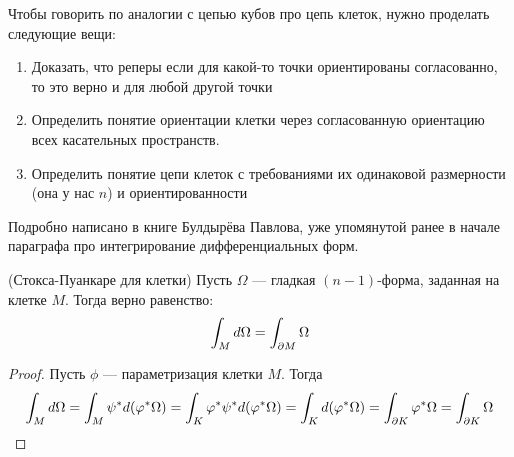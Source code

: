 \begin{anote}
	Чтобы говорить по аналогии с цепью кубов про цепь клеток, нужно проделать следующие вещи:
	\begin{enumerate}
		\item Доказать, что реперы если для какой-то точки ориентированы согласованно, то это верно и для любой другой точки
		
		\item Определить понятие ориентации клетки через согласованную ориентацию всех касательных пространств.
		
		\item Определить понятие цепи клеток с требованиями их одинаковой размерности (она у нас $n$) и ориентированности
	\end{enumerate}
	Подробно написано в книге Булдырёва Павлова, уже упомянутой ранее в начале параграфа про интегрирование дифференциальных форм.
\end{anote}

\begin{theorem} (Стокса-Пуанкаре для клетки)
	Пусть $\Omega$ --- гладкая $(n - 1)$-форма, заданная на клетке $M$. Тогда верно равенство:
	\[
		\int_M d\Omega = \int_{\partial M} \Omega
	\]
\end{theorem}

\begin{proof}
	Пусть $\phi$ --- параметризация клетки $M$. Тогда
	\[
		\int_M d\Omega = \int_M \psi^* d(\varphi^*\Omega) = \int_K \varphi^* \psi^* d(\varphi^*\Omega) = \int_K d(\varphi^*\Omega) = \int_{\partial K} \varphi^*\Omega = \int_{\partial K} \Omega
	\]
\end{proof}
